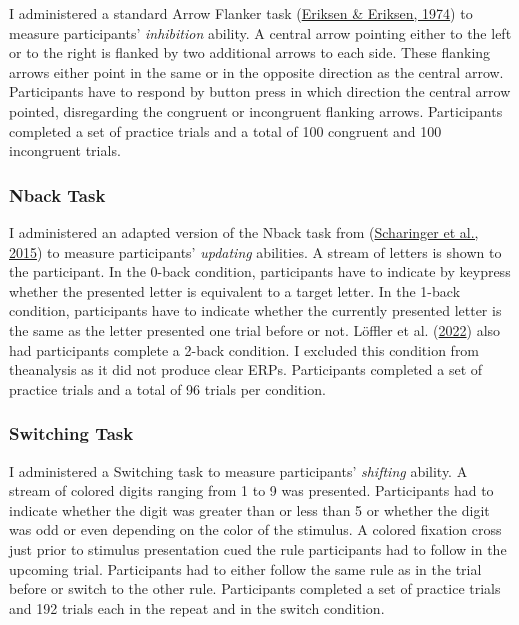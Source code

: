 \documentclass[
  man]{apa7}
\begin{document}
I administered a standard Arrow Flanker task (\protect\hyperlink{ref-eriksen1974effects}{Eriksen \& Eriksen, 1974}) to measure participants' \emph{inhibition} ability. A central arrow pointing either to the left or to the right is flanked by two additional arrows to each side. These flanking arrows either point in the same or in the opposite direction as the central arrow. Participants have to respond by button press in which direction the central arrow pointed, disregarding the congruent or incongruent flanking arrows. Participants completed a set of practice trials and a total of 100 congruent and 100 incongruent trials.

\hypertarget{nback-task}{%
\subsubsection{Nback Task}\label{nback-task}}

I administered an adapted version of the Nback task from (\protect\hyperlink{ref-scharinger2015flanker}{Scharinger et al., 2015}) to measure participants' \emph{updating} abilities. A stream of letters is shown to the participant. In the 0-back condition, participants have to indicate by keypress whether the presented letter is equivalent to a target letter. In the 1-back condition, participants have to indicate whether the currently presented letter is the same as the letter presented one trial before or not. Löffler et al. (\protect\hyperlink{ref-loffler2022common}{2022}) also had participants complete a 2-back condition. I excluded this condition from theanalysis as it did not produce clear ERPs. Participants completed a set of practice trials and a total of 96 trials per condition.

\hypertarget{switching-task}{%
\subsubsection{Switching Task}\label{switching-task}}

I administered a Switching task to measure participants' \emph{shifting} ability. A stream of colored digits ranging from 1 to 9 was presented. Participants had to indicate whether the digit was greater than or less than 5 or whether the digit was odd or even depending on the color of the stimulus. A colored fixation cross just prior to stimulus presentation cued the rule participants had to follow in the upcoming trial. Participants had to either follow the same rule as in the trial before or switch to the other rule. Participants completed a set of practice trials and 192 trials each in the repeat and in the switch condition.
\end{document}
